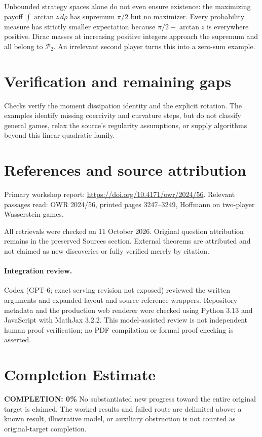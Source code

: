 \documentclass[11pt]{article}
\begin{document}
Unbounded strategy spaces alone do not even ensure existence: the maximizing payoff $\int\arctan z\,d\rho$ has supremum $\pi/2$ but no maximizer. Every probability measure has strictly smaller expectation because $\pi/2-\arctan z$ is everywhere positive. Dirac masses at increasing positive integers approach the supremum and all belong to $\mathcal P_2$. An irrelevant second player turns this into a zero-sum example.
\section{Verification and remaining gaps}
Checks verify the moment dissipation identity and the explicit rotation. The examples identify missing coercivity and curvature steps, but do not classify general games, relax the source's regularity assumptions, or supply algorithms beyond this linear-quadratic family.

\section{References and source attribution}
Primary workshop report: \url{https://doi.org/10.4171/owr/2024/56}. Relevant passages read: OWR 2024/56, printed pages 3247--3249, Hoffmann on two-player Wasserstein games.

All retrievals were checked on 11 October 2026. Original question attribution remains in the preserved Sources section. External theorems are attributed and not claimed as new discoveries or fully verified merely by citation.


\paragraph{Integration review.} Codex (GPT-6; exact serving revision not exposed) reviewed the written arguments and expanded layout and source-reference wrappers. Repository metadata and the production web renderer were checked using Python 3.13 and JavaScript with MathJax 3.2.2. This model-assisted review is not independent human proof verification; no PDF compilation or formal proof checking is asserted.

\section{Completion Estimate}
\noindent\textbf{COMPLETION: 0\%}
No substantiated new progress toward the entire original target is claimed. The worked results and failed route are delimited above; a known result, illustrative model, or auxiliary obstruction is not counted as original-target completion.
\end{document}
